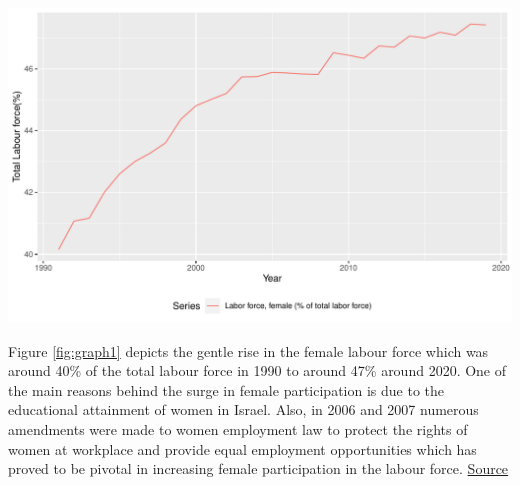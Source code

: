 \documentclass[11pt,a4paper,]{article}
\newenvironment{Shaded}{\begin{snugshade}}{\end{snugshade}}
\newcommand{\DataTypeTok}[1]{\textcolor[rgb]{0.13,0.29,0.53}{#1}}
\newcommand{\DecValTok}[1]{\textcolor[rgb]{0.00,0.00,0.81}{#1}}
\newcommand{\KeywordTok}[1]{\textcolor[rgb]{0.13,0.29,0.53}{\textbf{#1}}}
\newcommand{\NormalTok}[1]{#1}
\newcommand{\OperatorTok}[1]{\textcolor[rgb]{0.81,0.36,0.00}{\textbf{#1}}}
\newcommand{\StringTok}[1]{\textcolor[rgb]{0.31,0.60,0.02}{#1}}
\let\origfigure\figure
\let\endorigfigure\endfigure
\renewenvironment{figure}[1][2] {
    \expandafter\origfigure\expandafter[H]
} {
    \endorigfigure
}%
\begin{document}
\begin{Shaded}
\end{Shaded}

\begin{figure}
\centering
\includegraphics{report_files/figure-latex/graph1-1.pdf}
\caption{\label{fig:graph1}\% Female labour force out of total labour force}
\end{figure}

Figure \ref{fig:graph1} depicts the gentle rise in the female labour force which was around 40\% of the total labour force in 1990 to around 47\% around 2020. One of the main reasons behind the surge in female participation is due to the educational attainment of women in Israel. Also, in 2006 and 2007 numerous amendments were made to women employment law to protect the rights of women at workplace and provide equal employment opportunities which has proved to be pivotal in increasing female participation in the labour force. \href{https://mfa.gov.il/MFA/AboutIsrael/State/Law/Pages/Ensuring-equal-rights-for-women-in-Israel.aspx}{Source}
\end{document}

